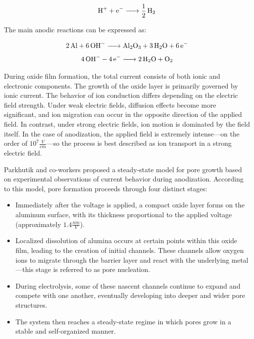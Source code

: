 \documentclass{rapportCS}
\begin{document}
	\begin{equation}
		\ce{H+ + e- -> 1/2 H2}
		\label{eq:redux}
	\end{equation}
	
	The main anodic reactions can be expressed as:
	
	\begin{equation}
		\ce{2Al + 6OH- -> Al2O3 + 3H2O + 6e-}
		\label{eq:anodic-reactions1}
	\end{equation}
	\begin{equation}
		\ce{4OH- - 4e- -> 2H2O + O2}
		\label{eq:anodic-reactions2}
	\end{equation}
	
	During oxide film formation, the total current consists of both ionic and electronic components. The growth of the oxide layer is primarily governed by ionic current. The behavior of ion conduction differs depending on the electric field strength. Under weak electric fields, diffusion effects become more significant, and ion migration can occur in the opposite direction of the applied field. In contrast, under strong electric fields, ion motion is dominated by the field itself. In the case of anodization, the applied field is extremely intense—on the order of $10^7 \frac{V}{cm}$—so the process is best described as ion transport in a strong electric field\cite{lv2017research}.
	
	Parkhutik and co-workers proposed a steady-state model for pore growth based on experimental observations of current behavior during anodization. According to this model, pore formation proceeds through four distinct stages:
	
	\begin{itemize}
		\item Immediately after the voltage is applied, a compact oxide layer forms on the aluminum surface, with its thickness proportional to the applied voltage (approximately $1.4 \frac{nm}{V}$).
		
		\item Localized dissolution of alumina occurs at certain points within this oxide film, leading to the creation of initial channels. These channels allow oxygen ions to migrate through the barrier layer and react with the underlying metal—this stage is referred to as pore nucleation.
		
		\item During electrolysis, some of these nascent channels continue to expand and compete with one another, eventually developing into deeper and wider pore structures.
		
		\item The system then reaches a steady-state regime in which pores grow in a stable and self-organized manner.
	\end{itemize}
	
\end{document}
